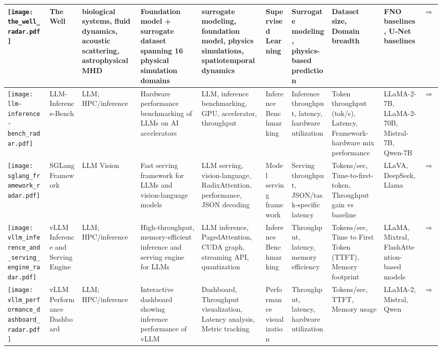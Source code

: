\begin{landscape}
{\begin{longtable}{|p{}|p{}|p{}|p{}|p{}|p{}|p{}|p{}|p{}|p{}|}
\texttt{[image: the\_well\_radar.pdf]} & The Well & biological systems, fluid dynamics, acoustic scattering, astrophysical MHD & Foundation model + surrogate dataset spanning 16 physical simulation domains & surrogate modeling, foundation model, physics simulations, spatiotemporal dynamics & Supervised Learning & Surrogate modeling, physics-based prediction & Dataset size, Domain breadth & FNO baselines, U-Net baselines & \cite{neurips2024_4f9a5acd}\href{https://polymathic-ai.org/the\_well/}{$\Rightarrow$} \\ \hline
\texttt{[image: llm-inference-bench\_radar.pdf]} & LLM-Inference-Bench & LLM; HPC/inference & Hardware performance benchmarking of LLMs on AI accelerators & LLM, inference benchmarking, GPU, accelerator, throughput & Inference Benchmarking & Inference throughput, latency, hardware utilization & Token throughput (tok/s), Latency, Framework-hardware mix performance & LLaMA-2-7B, LLaMA-2-70B, Mistral-7B, Qwen-7B & \cite{10820566}\href{https://github.com/argonne-lcf/LLM-Inference-Bench}{$\Rightarrow$} \\ \hline
\texttt{[image: sglang\_framework\_radar.pdf]} & SGLang Framework & LLM Vision & Fast serving framework for LLMs and vision-language models & LLM serving, vision-language, RadixAttention, performance, JSON decoding & Model serving framework & Serving throughput, JSON/task-specific latency & Tokens/sec, Time-to-first-token, Throughput gain vs baseline & LLaVA, DeepSeek, Llama & \cite{zheng2024sglangefficientexecutionstructured}\href{https://github.com/sgl-project/sglang/tree/main/benchmark}{$\Rightarrow$} \\ \hline
\texttt{[image: vllm\_inference\_and\_serving\_engine\_radar.pdf]} & vLLM Inference and Serving Engine & LLM; HPC/inference & High-throughput, memory-efficient inference and serving engine for LLMs & LLM inference, PagedAttention, CUDA graph, streaming API, quantization & Inference Benchmarking & Throughput, latency, memory efficiency & Tokens/sec, Time to First Token (TTFT), Memory footprint & LLaMA, Mixtral, FlashAttention-based models & \cite{10.1145/3600006.3613165}\href{https://github.com/vllm-project/vllm/tree/main/benchmarks}{$\Rightarrow$} \\ \hline
\texttt{[image: vllm\_performance\_dashboard\_radar.pdf]} & vLLM Performance Dashboard & LLM; HPC/inference & Interactive dashboard showing inference performance of vLLM & Dashboard, Throughput visualization, Latency analysis, Metric tracking & Performance visualization & Throughput, latency, hardware utilization & Tokens/sec, TTFT, Memory usage & LLaMA-2, Mistral, Qwen & \cite{mo2024vllm_dashboard}\href{https://simon-mo-workspace.observablehq.cloud/vllm-dashboard-v0/}{$\Rightarrow$} \\ \hline

\end{longtable}}
\end{landscape}
